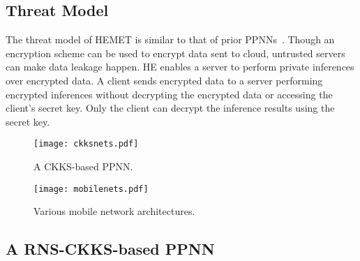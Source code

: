 \documentclass{article}
\begin{document}
\subsection{Threat Model}
The threat model of HEMET is similar to that of prior PPNNs~\cite{Brutzkus:ICML2019,Gilad-Bachrach:ICML2016,dathathri:2019PLDI,Dathathri:PLDI20:EVA}. Though an encryption scheme can be used to encrypt data sent to cloud, untrusted servers can make data leakage happen. HE enables a server to perform private inferences over encrypted data. A client sends encrypted data to a server performing encrypted inferences without decrypting the encrypted data or accessing the client's secret key. Only the client can decrypt the inference results using the secret key.



	




	
\begin{figure*}[t!]
	\centering
  \texttt{[image: ckksnets.pdf]}
	\vspace{-0.1in}
	\caption{A CKKS-based PPNN.}
	\label{f:ckks_ppnns}
	\vspace{-0.15in}
\end{figure*}

\begin{figure*}[t!]
		\centering
		\texttt{[image: mobilenets.pdf]}
		\vspace{-0.1in}
		\caption{Various mobile network architectures.}
		\label{f:prior_networks}
		\vspace{-0.2in}
\end{figure*}
	

\subsection{A RNS-CKKS-based PPNN}
\end{document}
